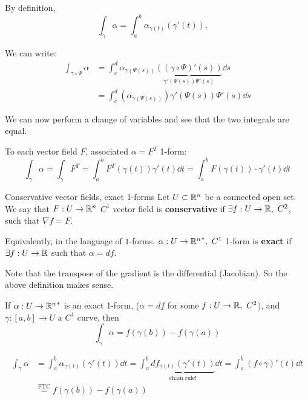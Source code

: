\documentclass[12pt]{article}
\begin{document}
\begin{proofbox}
    By definition,
    $$
        \int_\gamma \alpha = \int_{a}^{b} \alpha_{\gamma(t)} (\gamma'(t)),\quad 
    $$

    We can write:
    $$
    \begin{aligned}
        \int_{\gamma \circ \Psi} \alpha &= \int_{c}^{d} \alpha_{\gamma(\Psi(s))} \underbrace{ \left((\gamma \circ \Psi)'(s) \right)}_{\gamma'(\Psi(s)) \Psi'(s)} \dd s \\
        &= \int_{c}^{d} \left(\alpha_{\gamma(\Psi(s))}\right) \gamma'(\Psi(s)) \Psi'(s) \dd s
    \end{aligned}
    $$

    We can now perform a change of variables and see that the two integrals are equal.
\end{proofbox}

\begin{remark}{}{}
    To each vector field $F$, associated $\alpha = F^T$ 1-form:
    $$
        \int_{\gamma} \alpha = \int_\gamma F^T = \int_{a}^{b} F^T(\gamma(t)) \gamma'(t) \dd t = \int_{a}^{b} F(\gamma(t) )\cdot \gamma'(t) \dd t
    $$
\end{remark}

\begin{definition}{Conservative vector fields, exact 1-forms}{}
    Let $U \subset \mathbb{R}^n$ be a connected open set. We say that $F: U \rightarrow \mathbb{R}^n$ $C^1$ vector field is \textbf{conservative} if $\exists f: U \rightarrow \mathbb{R},\ C^2$, such that $\nabla f = F$.
    
    Equivalently, in the language of $1$-forms, $\alpha: U \rightarrow {\mathbb{R}^n}^*,\ C^1$ 1-form is \textbf{exact} if $\exists f: U \rightarrow \mathbb{R}$ such that $\alpha = df$.
\end{definition}

Note that the transpose of the gradient is the differential (Jacobian). So the above definition makes sense.

\begin{lemma}{}{}
    If $\alpha: U \rightarrow {\mathbb{R}^n}^*$ is an exact 1-form, ($\alpha = df$ for some $f: U \rightarrow \mathbb{R},\ C^2$), and $\gamma: [a, b] \rightarrow U \text{ a } C^1 \text{ curve}$, then
    $$
        \int_\gamma \alpha = f(\gamma(b)) - f(\gamma(a))
    $$
\end{lemma}

\begin{proofbox}
    $$
    \begin{aligned}
        \int_\gamma \alpha &= \int_{a}^{b} \alpha_{\gamma(t)} \left( \gamma'(t) \right) \dd t = \int_{a}^{b} \underbrace{df_{\gamma(t)} \left( \gamma'(t) \right)}_{\text{chain rule!}} \dd t = \int_{a}^{b} (f \circ \gamma)'(t) \dd t \\
        &\overset{\text{FTC}}= f(\gamma(b)) - f(\gamma(a))
    \end{aligned}
    $$
\end{proofbox}
\end{document}
